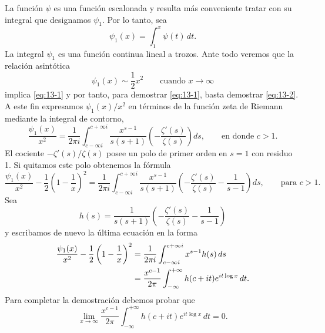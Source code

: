 \documentclass[12pt,a4paper]{book}
\begin{document}
    La función $\psi$ es una función escalonada y resulta más conveniente tratar con su
    integral que designamos $\psi_{1}$. Por lo tanto, sea
    \begin{equation*}
        \psi_{1}(x)=\int_{1}^{x}\psi(t)\,dt.
    \end{equation*}
    La integral $\psi_{1}$ es una función continua lineal a trozos. Ante todo veremos que la
    relación asintótica
    \begin{equation}\label{eq:13-2}
        \psi_{1}(x)\sim\frac{1}{2}x^{2}\qquad\text{cuando }x\to\infty
    \end{equation}
    implica \eqref{eq:13-1} y por tanto, para demostrar \eqref{eq:13-1}, basta demostrar \eqref{eq:13-2}. A este fin expresamos
    $\psi_{1}(x)/x^{2}$ en términos de la función zeta de Riemann mediante la integral de
    contorno,
    \begin{equation*}
        \frac{\psi_{1}(x)}{x^{2}}=\frac{1}{2\pi i}\int_{c-\infty i}^{c+\infty i}\frac{x^{s-1}}{s(s+1)}\left(-\frac{\zeta'(s)}{\zeta(s)}\right)ds,\qquad\text{en donde }c>1.
    \end{equation*}
    El cociente $-\zeta'(s)/\zeta(s)$ posee un polo de primer orden en $s=1$ con residuo 1. Si
    quitamos este polo obtenemos la fórmula
    \begin{equation*}
        \frac{\psi_{1}(x)}{x^{2}}-\frac{1}{2}\left(1-\frac{1}{x}\right)^{2}=\frac{1}{2\pi i}\int_{c-\infty i}^{c+\infty i}\frac{x^{s-1}}{s(s+1)}\left(-\frac{\zeta'(s)}{\zeta(s)}-\frac{1}{s-1}\right)ds,\qquad\text{para }c>1.
    \end{equation*}
    Sea
    \begin{equation*}
        h(s)=\frac{1}{s(s+1)}\left(-\frac{\zeta'(s)}{\zeta(s)}-\frac{1}{s-1}\right)
    \end{equation*}
    y escribamos de nuevo la última ecuación en la forma
    \begin{align}
        \frac{\psi_{1}(x)}{x^{2}}-\frac{1}{2}\left(1-\frac{1}{x}\right)^{2}&=\frac{1}{2\pi i}\int_{c-\infty i}^{c+\infty i}x^{s-1}h(s)\,ds\notag\\
        &=\frac{x^{c-1}}{2\pi}\int_{-\infty}^{+\infty}h(c+it)e^{it\log x}\,dt.\label{eq:13-3}
    \end{align}
    Para completar la demostración debemos probar que
    \begin{equation}\label{eq:13-4}
        \lim_{x\to\infty}\frac{x^{c-1}}{2\pi}\int_{-\infty}^{+\infty}h(c+it)e^{it\log x}\,dt=0.
    \end{equation}
\end{document}
